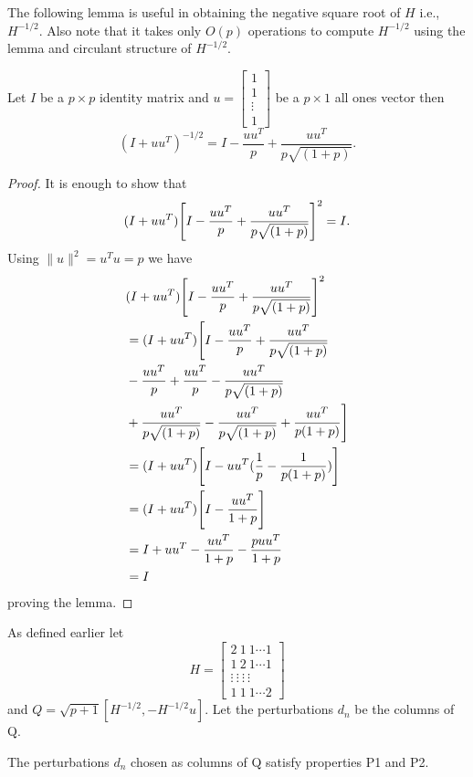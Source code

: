 The following lemma is useful in obtaining the negative square root of $H$ i.e., 
$H^{-1/2}$. Also note that it takes only $O(p)$ operations to compute $H^{-1/2}$
using the lemma and circulant structure of $H^{-1/2}$.
\begin{lemma}
 \label{lemma: gen Sherman-Morisson}
Let $I$ be a $p \times p$ identity matrix and $u = 
\left[
 \begin{array}{cccc}
 1 \\ 1 \\  \vdots \\ 1 
\end{array} \right]$ be a $p \times 1$ all ones vector then
$$ (I+uu^T)^{-1/2}= I-\frac{uu^T}{p}+\frac{uu^T}{p\sqrt{(1+p)}}.$$
\end{lemma}

\begin{proof}
It is enough to show that
$$(I+uu^T)\Bigg{[}I-\frac{uu^T}{p}+\frac{uu^T}{p\sqrt{(1+p)}}\Bigg{]}^2=I.$$
Using $\|u\|^2=u^Tu=p$ we have
\begin{align*}
 & (I+uu^T)\Bigg{[}I-\frac{uu^T}{p}+\frac{uu^T}{p\sqrt{(1+p)}}\Bigg{]}^2\\
 &= (I+uu^T)\Bigg{[}I-\frac{uu^T}{p}+\frac{uu^T}{p\sqrt{(1+p)}}\\
 &-\frac{uu^T}{p}+\frac{uu^T}{p}-\frac{uu^T}{p\sqrt{(1+p)}}\\
 &+\frac{uu^T}{p\sqrt{(1+p)}}-\frac{uu^T}{p\sqrt{(1+p)}}+\frac{uu^T}{p(1+p)}\Bigg{]}\\
 &=(I+uu^T)\Bigg{[}I-uu^T(\frac{1}{p}-\frac{1}{p(1+p)})\Bigg{]}\\
 &=(I+uu^T)\Bigg{[}I-\frac{uu^T}{1+p}\Bigg{]}\\
 &=I+uu^T-\frac{uu^T}{1+p}-\frac{puu^T}{1+p}\\
 &=I
\end{align*}
proving the lemma.
\end{proof}
As defined earlier let \begin{equation*} H = \left[\begin{array}{cccc}
2 \ 1 \ 1 \cdots 1\\ 
1 \ 2 \ 1 \cdots 1 \\
\vdots \ \vdots \ \vdots \ \vdots\\
1 \ 1 \ 1 \cdots 2
\end{array}\right]
\end{equation*}
and $Q=\sqrt{p+1}[H^{-1/2},-H^{-1/2}u].$
Let the perturbations $d_n$ be the columns of Q. 
\begin{lemma}
 The perturbations $d_n$ chosen as columns of Q satisfy properties P1 and P2.
\end{lemma}
